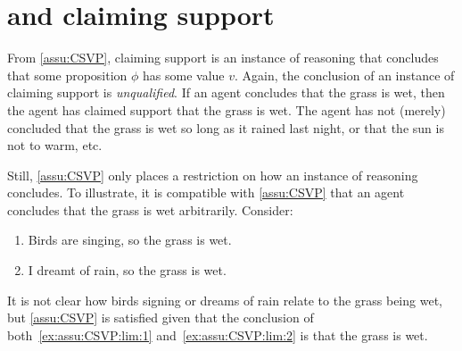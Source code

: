 \chapter{ and claiming support}
\label{cha:claiming-support}

\begin{note}
  From \autoref{assu:CSVP}, claiming support is an instance of reasoning that concludes that some proposition \(\phi\) has some value \(v\).
  Again, the conclusion of an instance of claiming support is \emph{unqualified}.
  If an agent concludes that the grass is wet, then the agent has claimed support that the grass is wet.
  The agent has not (merely) concluded that the grass is wet so long as it rained last night, or that the sun is not to warm, etc.\

  Still, \autoref{assu:CSVP} only places a restriction on how an instance of reasoning concludes.
  To illustrate, it is compatible with \autoref{assu:CSVP} that an agent concludes that the grass is wet arbitrarily.
  Consider:
  \begin{enumerate}
  \item\label{ex:assu:CSVP:lim:1} Birds are singing, so the grass is wet.
  \item\label{ex:assu:CSVP:lim:2} I dreamt of rain, so the grass is wet.
  \end{enumerate}
  It is not clear how birds signing or dreams of rain relate to the grass being wet, but \autoref{assu:CSVP} is satisfied given that the conclusion of both~\ref{ex:assu:CSVP:lim:1} and~\ref{ex:assu:CSVP:lim:2} is that the grass is wet.
\end{note}

